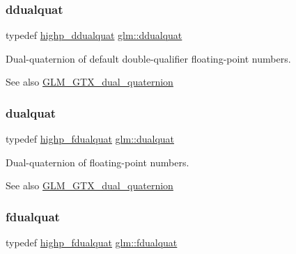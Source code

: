 \subsubsection{\texorpdfstring{ddualquat}{ddualquat}}
{\footnotesize\ttfamily typedef \mbox{\hyperlink{group__gtx__dual__quaternion_ga83e4c5d27c8b0a264a3f3aed24f3f84e}{highp\+\_\+ddualquat}} \mbox{\hyperlink{group__gtx__dual__quaternion_ga373431ffdd82d5c03c258217a9e1f1a6}{glm\+::ddualquat}}}

Dual-\/quaternion of default double-\/qualifier floating-\/point numbers.

\begin{DoxySeeAlso}{See also}
\mbox{\hyperlink{group__gtx__dual__quaternion}{G\+L\+M\+\_\+\+G\+T\+X\+\_\+dual\+\_\+quaternion}} 
\end{DoxySeeAlso}
\mbox{\label{group__gtx__dual__quaternion_ga2f6227b5f9dc08a2e7682065a84b3aa9}} 
\subsubsection{\texorpdfstring{dualquat}{dualquat}}
{\footnotesize\ttfamily typedef \mbox{\hyperlink{group__gtx__dual__quaternion_ga8c46d61c38b2b6d9c5091c667dd20fe8}{highp\+\_\+fdualquat}} \mbox{\hyperlink{group__gtx__dual__quaternion_ga2f6227b5f9dc08a2e7682065a84b3aa9}{glm\+::dualquat}}}

Dual-\/quaternion of floating-\/point numbers.

\begin{DoxySeeAlso}{See also}
\mbox{\hyperlink{group__gtx__dual__quaternion}{G\+L\+M\+\_\+\+G\+T\+X\+\_\+dual\+\_\+quaternion}} 
\end{DoxySeeAlso}
\mbox{\label{group__gtx__dual__quaternion_ga436906129bc69ca5059555cafcbac9fd}} 
\subsubsection{\texorpdfstring{fdualquat}{fdualquat}}
{\footnotesize\ttfamily typedef \mbox{\hyperlink{group__gtx__dual__quaternion_ga8c46d61c38b2b6d9c5091c667dd20fe8}{highp\+\_\+fdualquat}} \mbox{\hyperlink{group__gtx__dual__quaternion_ga436906129bc69ca5059555cafcbac9fd}{glm\+::fdualquat}}}

